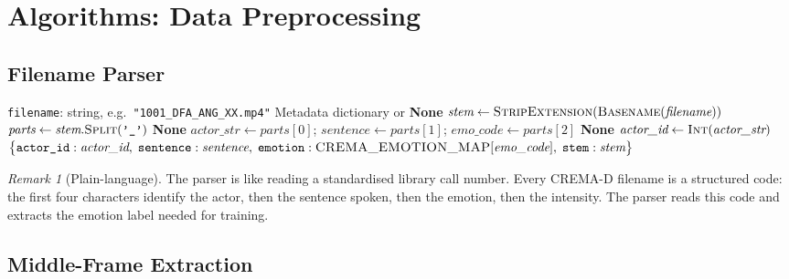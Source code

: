 \documentclass[12pt,a4paper]{article}
\theoremstyle{definition}
\theoremstyle{remark}
\newtheorem{remark}[theorem]{Remark}
\begin{document}
\section{Algorithms: Data Preprocessing}

\subsection{Filename Parser}

\begin{algorithm}[H]
\caption{CREMA-D Filename Parser}
\label{alg:filename_parser}
\begin{algorithmic}[1]
\Require \texttt{filename}: string, e.g.\ \texttt{"1001\_DFA\_ANG\_XX.mp4"}
\Ensure Metadata dictionary or \textbf{None}
\State $\textit{stem} \gets \textsc{StripExtension}(\textsc{Basename}(\textit{filename}))$
\State $\textit{parts} \gets \textit{stem}.\textsc{Split}(\texttt{'\_'})$
  \State \Return \textbf{None} 
\EndIf
\State $\textit{actor\_str} \gets \textit{parts}[0]$; \quad
       $\textit{sentence} \gets \textit{parts}[1]$; \quad
       $\textit{emo\_code} \gets \textit{parts}[2]$
  \State \Return \textbf{None} 
\EndIf
\State $\textit{actor\_id} \gets \textsc{Int}(\textit{actor\_str})$ 
\State \Return $\bigl\{\texttt{actor\_id}: \textit{actor\_id},\;
               \texttt{sentence}: \textit{sentence},\;
               \texttt{emotion}: \textsc{CREMA\_EMOTION\_MAP}[\textit{emo\_code}],\;
               \texttt{stem}: \textit{stem}\bigr\}$
\end{algorithmic}
\end{algorithm}

\begin{remark}[Plain-language]
The parser is like reading a standardised library call number.
Every CREMA-D filename is a structured code: the first four characters identify
the actor, then the sentence spoken, then the emotion, then the intensity.
The parser reads this code and extracts the emotion label needed for training.
\end{remark}

\subsection{Middle-Frame Extraction}
\end{document}

